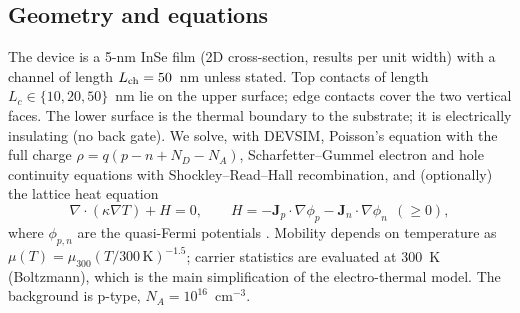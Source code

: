 \documentclass[11pt]{article}
\begin{document}
\subsection{Geometry and equations}
The device is a 5-nm InSe film (2D cross-section, results per unit width) with a channel of length $L_{\rm ch}=50$~nm unless stated. Top contacts of length $L_c\in\{10,20,50\}$~nm lie on the upper surface; edge contacts cover the two vertical faces. The lower surface is the thermal boundary to the substrate; it is electrically insulating (no back gate). We solve, with DEVSIM, Poisson's equation with the full charge $\rho=q(p-n+N_D-N_A)$, Scharfetter--Gummel electron and hole continuity equations with Shockley--Read--Hall recombination, and (optionally) the lattice heat equation
\begin{equation}
\nabla\cdot(\kappa\nabla T)+H=0,\qquad H=-\mathbf{J}_p\cdot\nabla\phi_p-\mathbf{J}_n\cdot\nabla\phi_n\ \ (\geq0),
\end{equation}
where $\phi_{p,n}$ are the quasi-Fermi potentials \cite{refwachutka}. Mobility depends on temperature as $\mu(T)=\mu_{300}(T/300\,\mathrm{K})^{-1.5}$; carrier statistics are evaluated at 300~K (Boltzmann), which is the main simplification of the electro-thermal model. The background is p-type, $N_A=10^{16}$~cm$^{-3}$.
\end{document}
